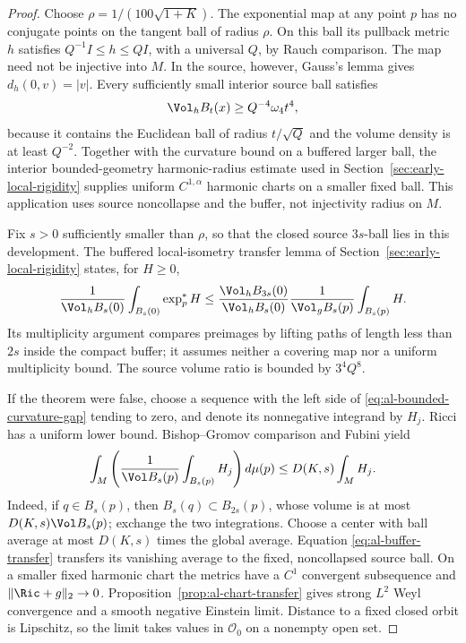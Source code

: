 \begin{proof}
Choose $\rho=1/(100\sqrt{1+K})$.  The exponential map at any point $p$
has no conjugate points on the tangent ball of radius $\rho$.  On this
ball its pullback metric $h$ satisfies
$Q^{-1}I\le h\le QI$, with a universal $Q$, by Rauch comparison.
The map need not be injective into $M$.  In the source, however,
Gauss's lemma gives $d_h(0,v)=|v|$.  Every sufficiently small interior
source ball satisfies
\[
 \Vol_h B_t(x)\ge Q^{-4}\omega_4t^4,
\]
because it contains the Euclidean ball of radius $t/\sqrt Q$ and the
volume density is at least $Q^{-2}$.  Together with the curvature bound
on a buffered larger ball, the interior bounded-geometry harmonic-radius
estimate used in Section~\ref{sec:early-local-rigidity} supplies uniform
$C^{1,\alpha}$ harmonic charts on a smaller fixed ball.  This application
uses source noncollapse and the buffer, not injectivity radius on $M$.

Fix $s>0$ sufficiently smaller than $\rho$, so that the closed source
$3s$-ball lies in this development.  The buffered local-isometry transfer
lemma of Section~\ref{sec:early-local-rigidity} states, for $H\ge0$,
\begin{equation}\label{eq:al-buffer-transfer}
 \frac1{\Vol_hB_s(0)}\int_{B_s(0)}\exp_p^*H
 \le\frac{\Vol_h B_{3s}(0)}{\Vol_h B_s(0)}
       \frac1{\Vol_g B_s(p)}\int_{B_s(p)}H.
\end{equation}
Its multiplicity argument compares preimages by lifting paths of length
less than $2s$ inside the compact buffer; it assumes neither a covering
map nor a uniform multiplicity bound.  The source volume ratio is bounded
by $3^4Q^8$.

If the theorem were false, choose a sequence with the left side of
\eqref{eq:al-bounded-curvature-gap} tending to zero, and denote its
nonnegative integrand by $H_j$.  Ricci has a uniform lower bound.
Bishop--Gromov comparison and Fubini yield
\[
 \int_M\left(\frac1{\Vol B_s(p)}\int_{B_s(p)}H_j\right)d\mu(p)
 \le D(K,s)\int_M H_j.
\]
Indeed, if $q\in B_s(p)$, then $B_s(q)\subset B_{2s}(p)$, whose volume
is at most $D(K,s)\Vol B_s(p)$; exchange the two integrations.
Choose a center with ball average at most $D(K,s)$ times the global
average.  Equation \eqref{eq:al-buffer-transfer} transfers its vanishing
average to the fixed, noncollapsed source ball.  On a smaller fixed
harmonic chart the metrics have a $C^1$ convergent subsequence and
$\|\Ric+g\|_2\to0$.  Proposition~\ref{prop:al-chart-transfer} gives
strong $L^2$ Weyl convergence and a smooth negative Einstein limit.
Distance to a fixed closed orbit is Lipschitz, so the limit takes values
in $\mathscr O_0$ on a nonempty open set.


\end{proof}

